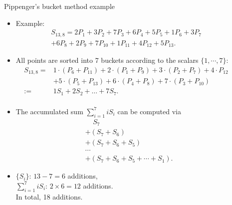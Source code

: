 \documentclass[final]{beamer}
\newlength{\sepwid}
\newlength{\onecolwid}
\begin{document}
\begin{frame}[t]
\begin{columns}[t]
\begin{column}{\onecolwid}
\begin{block}{Pippenger's bucket method example}
\begin{small}
	\begin{itemize}	
		\item Example:
		\begin{eqnarray*}
		S_{13,8}=2 P_{1}+3 P_{2}+7 P_{3}+6 P_{4}+5 P_{5}+1 P_{6}+3 P_{7}\\
		+6 P_{8}+2 P_{9}+7 P_{10}+1 P_{11}+4 P_{12}+5 P_{13}.
		\end{eqnarray*}
		
		\item All points are sorted into 7 buckets according to the scalars $\{1, \cdots, 7\}$:
		\begin{equation*}
		\begin{aligned}
		S_{13,8}=& 1 \cdot\left(P_{6}+P_{11}\right)+2 \cdot\left(P_{1}+P_{9}\right)+3 \cdot\left(P_{2}+P_{7}\right)+4 \cdot P_{12} \\
		&+5 \cdot\left(P_{5}+P_{13}\right)+6 \cdot\left(P_{4}+P_{8}\right)+7 \cdot\left(P_{3}+P_{10}\right) \\
		:=& 1 S_{1}+2 S_{2}+\ldots+7 S_{7}.\\
		\end{aligned}
		\end{equation*}					
		\item {The accumulated sum $\sum_{i=1}^{7}iS_i$ can be computed via
		\begin{equation*}
		\begin{aligned}
		&\ \ \ \ \  S_7 \\
		&+ (S_7+S_6)\\
		&+ (S_7+S_6+S_5)\\
		&\cdots \\
		&+(S_7+S_6+S_5+\cdots +S_1).
		\end{aligned}
		\end{equation*}	}			
		
		\item $\{S_i\}$: $13 - 7 = 6$ additions,\\
		$\sum_{i = 1}^{7} iS_i$: $2\times 6 = 12$ additions. \\
		In total, 18 additions.	
	\end{itemize}
\end{small}
\end{block}


\end{column} 
\begin{column}{\sepwid}\end{column} %


\end{columns}
\end{frame}
\end{document}
